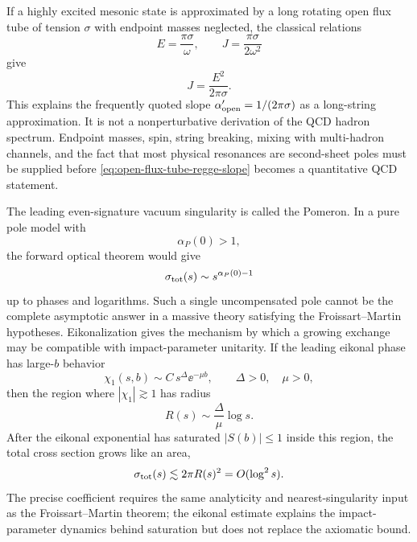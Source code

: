 \begin{controlledapproximation}
\label{ca:flux-tube-slope-regge-phenomenology}
If a highly excited mesonic state is approximated by a long rotating open flux
tube of tension \(\sigma\) with endpoint masses neglected, the classical
relations
\[
  E=\frac{\pi\sigma}{\omega},\qquad
  J=\frac{\pi\sigma}{2\omega^2}
\]
give
\begin{equation}
  J=\frac{E^2}{2\pi\sigma}.
  \label{eq:open-flux-tube-regge-slope}
\end{equation}
This explains the frequently quoted slope
\(\alpha'_{\rm open}=1/(2\pi\sigma)\) as a long-string approximation.  It is
not a nonperturbative derivation of the QCD hadron spectrum.  Endpoint masses,
spin, string breaking, mixing with multi-hadron channels, and the fact that
most physical resonances are second-sheet poles must be supplied before
\eqref{eq:open-flux-tube-regge-slope} becomes a quantitative QCD statement.
\end{controlledapproximation}

The leading even-signature vacuum singularity is called the Pomeron.  In a
pure pole model with
\[
  \alpha_P(0)>1,
\]
the forward optical theorem would give
\[
  \sigma_{\rm tot}(s)\sim s^{\alpha_P(0)-1}
\]
up to phases and logarithms.  Such a single uncompensated pole cannot be the
complete asymptotic answer in a massive theory satisfying the
Froissart--Martin hypotheses.  Eikonalization gives the mechanism by which a
growing exchange may be compatible with impact-parameter unitarity.  If the
leading eikonal phase has large-\(b\) behavior
\[
  \chi_1(s,b)\sim C\,s^{\Delta}\ee^{-\mu b},
  \qquad \Delta>0,\quad \mu>0,
\]
then the region where \(|\chi_1|\gtrsim1\) has radius
\[
  R(s)\sim\frac{\Delta}{\mu}\log s .
\]
After the eikonal exponential has saturated \(|S(b)|\le1\) inside this
region, the total cross section grows like an area,
\[
  \sigma_{\rm tot}(s)\lesssim 2\pi R(s)^2
  =
  O(\log^2s).
\]
The precise coefficient requires the same analyticity and nearest-singularity
input as the Froissart--Martin theorem; the eikonal estimate explains the
impact-parameter dynamics behind saturation but does not replace the
axiomatic bound.

